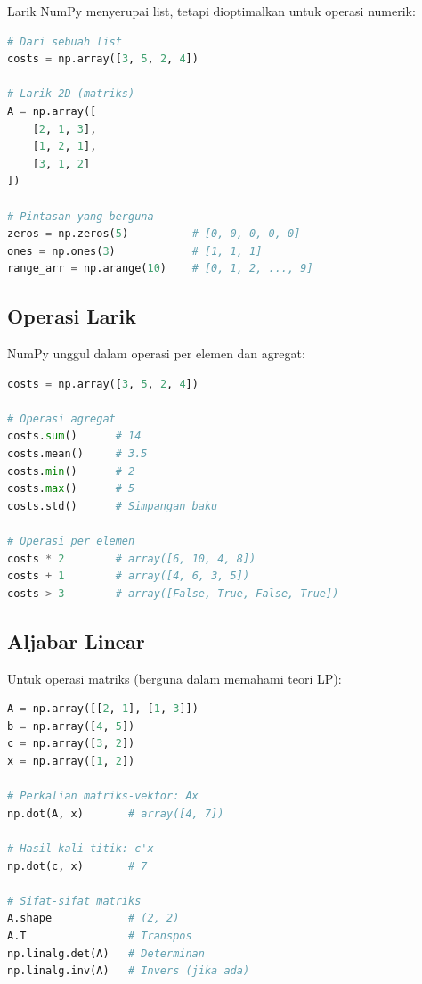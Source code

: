 Larik NumPy menyerupai list, tetapi dioptimalkan untuk operasi numerik:

\begin{lstlisting}[language=Python]
# Dari sebuah list
costs = np.array([3, 5, 2, 4])

# Larik 2D (matriks)
A = np.array([
    [2, 1, 3],
    [1, 2, 1],
    [3, 1, 2]
])

# Pintasan yang berguna
zeros = np.zeros(5)          # [0, 0, 0, 0, 0]
ones = np.ones(3)            # [1, 1, 1]
range_arr = np.arange(10)    # [0, 1, 2, ..., 9]
\end{lstlisting}

\subsection{Operasi Larik}

NumPy unggul dalam operasi per elemen dan agregat:

\begin{lstlisting}[language=Python]
costs = np.array([3, 5, 2, 4])

# Operasi agregat
costs.sum()      # 14
costs.mean()     # 3.5
costs.min()      # 2
costs.max()      # 5
costs.std()      # Simpangan baku

# Operasi per elemen
costs * 2        # array([6, 10, 4, 8])
costs + 1        # array([4, 6, 3, 5])
costs > 3        # array([False, True, False, True])
\end{lstlisting}

\subsection{Aljabar Linear}

Untuk operasi matriks (berguna dalam memahami teori LP):

\begin{lstlisting}[language=Python]
A = np.array([[2, 1], [1, 3]])
b = np.array([4, 5])
c = np.array([3, 2])
x = np.array([1, 2])

# Perkalian matriks-vektor: Ax
np.dot(A, x)       # array([4, 7])

# Hasil kali titik: c'x
np.dot(c, x)       # 7

# Sifat-sifat matriks
A.shape            # (2, 2)
A.T                # Transpos
np.linalg.det(A)   # Determinan
np.linalg.inv(A)   # Invers (jika ada)
\end{lstlisting}


